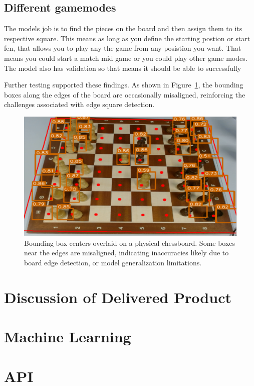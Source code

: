 \subsection{Different gamemodes}

The models job is to find the pieces on the board and then assign them to its respective square. This means as long as you define the starting postion or start fen, that allows you to play any the game from any posistion you want. That means you could start a match mid game or you could play other game modes. The model also has validation so that means it should be able to successfully



Further testing supported these findings. As shown in Figure~\ref{fig:bbox-centers-incorrect}, the bounding boxes along the edges of the board are occasionally misaligned, reinforcing the challenges associated with edge square detection.

\begin{figure}[h!]
    \centering
    \includegraphics[width=0.75\linewidth]{figures/discussion/bbox-centers-incorrect.png}
    \caption{Bounding box centers overlaid on a physical chessboard. Some boxes near the edges are misaligned, indicating inaccuracies likely due to board edge detection, or model generalization limitations.}
    \label{fig:bbox-centers-incorrect}
\end{figure}

\section{Discussion of Delivered Product}

\section{Machine Learning}

\section{API}

